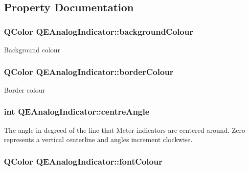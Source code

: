 \subsection{Property Documentation}
\hypertarget{classQEAnalogIndicator_a57c6c5f75b77abe25fc6c01803a4c03d}{
\subsubsection[{backgroundColour}]{\setlength{\rightskip}{0pt plus 5cm}QColor QEAnalogIndicator::backgroundColour}}
\label{classQEAnalogIndicator_a57c6c5f75b77abe25fc6c01803a4c03d}
Background colour \hypertarget{classQEAnalogIndicator_a001418f50a836dae0cf488dceae6ce0d}{
\subsubsection[{borderColour}]{\setlength{\rightskip}{0pt plus 5cm}QColor QEAnalogIndicator::borderColour}}
\label{classQEAnalogIndicator_a001418f50a836dae0cf488dceae6ce0d}
Border colour \hypertarget{classQEAnalogIndicator_a8d0b385d12db1960b0d6b9266a1027f0}{
\subsubsection[{centreAngle}]{\setlength{\rightskip}{0pt plus 5cm}int QEAnalogIndicator::centreAngle}}
\label{classQEAnalogIndicator_a8d0b385d12db1960b0d6b9266a1027f0}
The angle in degreed of the line that Meter indicators are centered around. Zero represents a vertical centerline and angles increment clockwise. \hypertarget{classQEAnalogIndicator_aa469d827ef97d89741a1eacf37c10086}{
\subsubsection[{fontColour}]{\setlength{\rightskip}{0pt plus 5cm}QColor QEAnalogIndicator::fontColour}}
